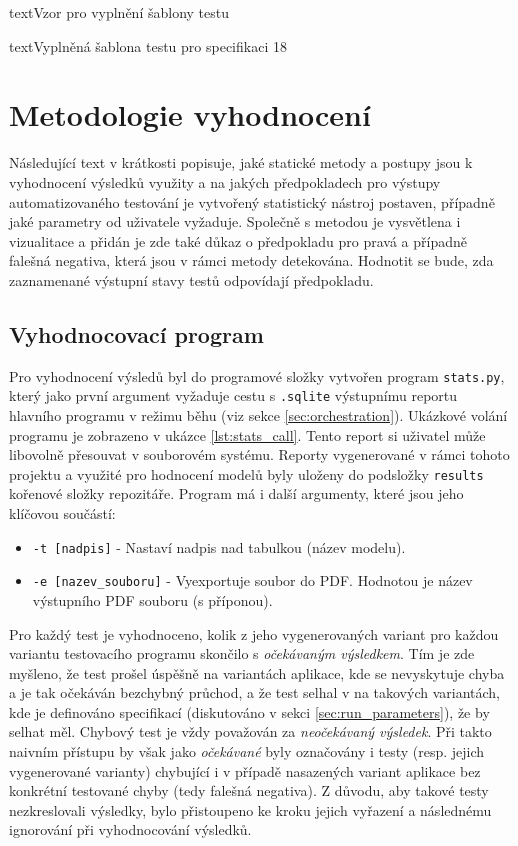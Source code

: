 \documentclass[czech, ma, kiv, he, iso690numb, pdf, viewonly]{fasthesis}
\begin{document}
\begin{code}{text}{Vzor pro vyplnění šablony testu \label{lst:template}}
{\begin{code}{text}{Vyplněná šablona testu pro specifikaci 18 \label{lst:spec18}}
{    \section{Metodologie vyhodnocení}

        Následující text v krátkosti popisuje, jaké statické metody a postupy jsou k vyhodnocení výsledků využity a na jakých předpokladech pro výstupy automatizovaného testování je vytvořený statistický nástroj postaven, případně jaké parametry od uživatele vyžaduje. Společně s metodou je vysvětlena i vizualitace a přidán je zde také důkaz o předpokladu pro pravá a případně falešná negativa, která jsou v rámci metody detekována. Hodnotit se bude, zda zaznamenané výstupní stavy testů odpovídají předpokladu.
        
        \subsection{Vyhodnocovací program} \label{sec:evaluation}

        Pro vyhodnocení výsledů byl do programové složky vytvořen program \verb|stats.py|, který jako první argument vyžaduje cestu s \verb|.sqlite| výstupnímu reportu hlavního programu v režimu běhu (viz sekce \ref{sec:orchestration}). Ukázkové volání programu je zobrazeno v ukázce \ref{lst:stats_call}. Tento report si uživatel může libovolně přesouvat v souborovém systému. Reporty vygenerované v rámci tohoto projektu a využité pro hodnocení modelů byly uloženy do podsložky \verb|results| kořenové složky repozitáře. Program má i další argumenty, které jsou jeho klíčovou součástí:
        \begin{itemize}
            \item \verb|-t [nadpis]| - Nastaví nadpis nad tabulkou (název modelu).
            \item \verb|-e [nazev_souboru]| - Vyexportuje soubor do PDF. Hodnotou je název výstupního PDF souboru (s příponou).
        \end{itemize}
        Pro každý test je vyhodnoceno, kolik z jeho vygenerovaných variant pro každou variantu testovacího programu skončilo s \textit{očekávaným výsledkem}. Tím je zde myšleno, že test prošel úspěšně na variantách aplikace, kde se nevyskytuje chyba a je tak očekáván bezchybný průchod, a že test selhal v na takových variantách, kde je definováno specifikací (diskutováno v sekci \ref{sec:run_parameters}), že by selhat měl. Chybový test je vždy považován za \textit{neočekávaný výsledek}. Při takto naivním přístupu by však jako \emph{očekávané} byly označovány i testy (resp. jejich vygenerované varianty) chybující i v případě nasazených variant aplikace bez konkrétní testované chyby (tedy falešná negativa). Z důvodu, aby takové testy nezkreslovali výsledky, bylo přistoupeno ke kroku jejich vyřazení a následnému ignorování při vyhodnocování výsledků.

}
\end{code}}
\end{code}
\end{document}

